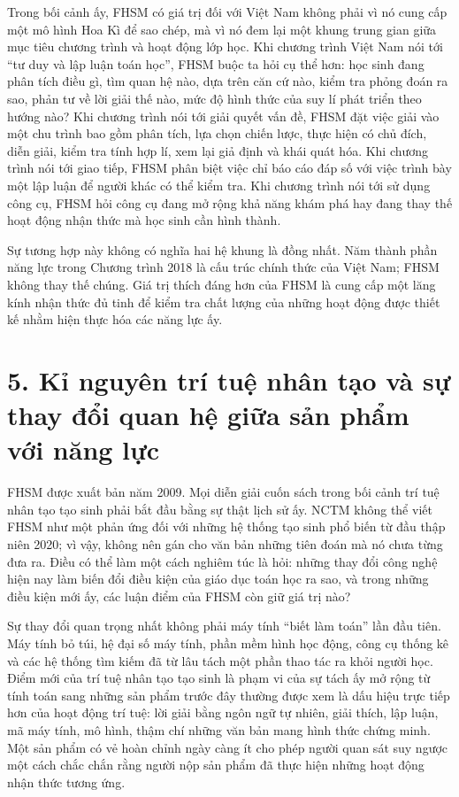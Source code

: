 Trong bối cảnh ấy, FHSM có giá trị đối với Việt Nam không phải vì nó cung cấp
một mô hình Hoa Kì để sao chép, mà vì nó đem lại một khung trung gian giữa
mục tiêu chương trình và hoạt động lớp học. Khi chương trình Việt Nam nói tới
``tư duy và lập luận toán học'', FHSM buộc ta hỏi cụ thể hơn: học sinh đang
phân tích điều gì, tìm quan hệ nào, dựa trên căn cứ nào, kiểm tra phỏng đoán
ra sao, phản tư về lời giải thế nào, mức độ hình thức của suy lí phát triển
theo hướng nào? Khi chương trình nói tới giải quyết vấn đề, FHSM đặt việc giải
vào một chu trình bao gồm phân tích, lựa chọn chiến lược, thực hiện có chủ
đích, diễn giải, kiểm tra tính hợp lí, xem lại giả định và khái quát hóa. Khi
chương trình nói tới giao tiếp, FHSM phân biệt việc chỉ báo cáo đáp số với
việc trình bày một lập luận để người khác có thể kiểm tra. Khi chương trình
nói tới sử dụng công cụ, FHSM hỏi công cụ đang mở rộng khả năng khám phá hay
đang thay thế hoạt động nhận thức mà học sinh cần hình thành.

Sự tương hợp này không có nghĩa hai hệ khung là đồng nhất. Năm thành phần năng
lực trong Chương trình 2018 là cấu trúc chính thức của Việt Nam; FHSM không
thay thế chúng. Giá trị thích đáng hơn của FHSM là cung cấp một lăng kính
nhận thức đủ tinh để kiểm tra chất lượng của những hoạt động được thiết kế
nhằm hiện thực hóa các năng lực ấy.

\section*{5. Kỉ nguyên trí tuệ nhân tạo và sự thay đổi quan hệ giữa sản phẩm với năng lực}

FHSM được xuất bản năm 2009. Mọi diễn giải cuốn sách trong bối cảnh trí tuệ
nhân tạo tạo sinh phải bắt đầu bằng sự thật lịch sử ấy. NCTM không thể viết
FHSM như một phản ứng đối với những hệ thống tạo sinh phổ biến từ đầu thập
niên 2020; vì vậy, không nên gán cho văn bản những tiên đoán mà nó chưa từng
đưa ra. Điều có thể làm một cách nghiêm túc là hỏi: những thay đổi công nghệ
hiện nay làm biến đổi điều kiện của giáo dục toán học ra sao, và trong những
điều kiện mới ấy, các luận điểm của FHSM còn giữ giá trị nào?

Sự thay đổi quan trọng nhất không phải máy tính ``biết làm toán'' lần đầu
tiên. Máy tính bỏ túi, hệ đại số máy tính, phần mềm hình học động, công cụ
thống kê và các hệ thống tìm kiếm đã từ lâu tách một phần thao tác ra khỏi
người học. Điểm mới của trí tuệ nhân tạo tạo sinh là phạm vi của sự tách ấy
mở rộng từ tính toán sang những sản phẩm trước đây thường được xem là dấu hiệu
trực tiếp hơn của hoạt động trí tuệ: lời giải bằng ngôn ngữ tự nhiên, giải
thích, lập luận, mã máy tính, mô hình, thậm chí những văn bản mang hình thức
chứng minh. Một sản phẩm có vẻ hoàn chỉnh ngày càng ít cho phép người quan sát
suy ngược một cách chắc chắn rằng người nộp sản phẩm đã thực hiện những hoạt
động nhận thức tương ứng.

